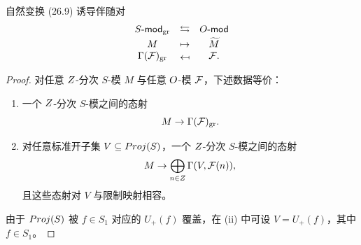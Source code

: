 \begin{proposition}\label{prop:26.3.3}
自然变换 (26.9) 诱导伴随对
\[
\begin{array}{ccc}
S\text{-}\mathsf{mod}_{\mathrm{gr}} & \leftrightarrows & \cO\text{-}\mathsf{mod}\\[0.4ex]
M & \mapsto & \widetilde{M}\\
\Gamma(\cF)_{\mathrm{gr}} & \mapsfrom & \cF.
\end{array}
\]
\end{proposition}

\begin{proof}
对任意 $Z$-分次 $S$-模 $M$ 与任意 $O$-模 $\mathcal{F}$，下述数据等价：
\begin{enumerate}[label=(\roman*),leftmargin=2.6em,itemsep=0.25ex]
  \item 一个 $Z$-分次 $S$-模之间的态射
  \[
  M \to \Gamma(\mathcal{F})_{\mathrm{gr}}.
  \]
  \item 对任意标准开子集 $V \subseteq Proj(S)$，一个 $Z$-分次 $S$-模之间的态射
  \[
  M \to \bigoplus_{n \in Z} \Gamma(V, \mathcal{F}(n)),
  \]
  且这些态射对 $V$ 与限制映射相容。
\end{enumerate}
由于 $Proj(S)$ 被 $f \in S_1$ 对应的 $U_+(f)$ 覆盖，在 (ii) 中可设 $V = U_+(f)$，其中 $f \in S_1$。


\end{proof}
